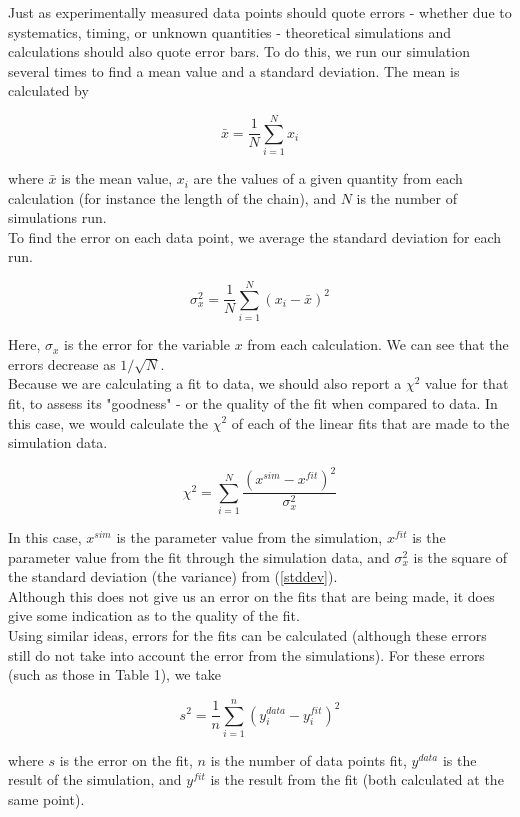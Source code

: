 \documentclass{article}
\begin{document}
\begin{multicols}{2}
Just as experimentally measured data points should quote errors - whether due to systematics, timing, or unknown quantities - theoretical simulations and calculations should also quote error bars.  To do this, we run our simulation several times to find a mean value and a standard deviation.  The mean is calculated by

\begin{equation}
\bar x = \frac{1}{N} \sum \limits _{i=1}^N x_i
\end{equation}

\noindent where $\bar x$ is the mean value, $x_i$ are the values of a given quantity from each calculation (for instance the length of the chain), and $N$ is the number of simulations run.\\

To find the error on each data point, we average the standard deviation for each run.

\begin{equation}
\label{stddev}
\sigma _x^2 = \frac{1}{N} \sum \limits _{i=1} ^N (x_i - \bar x)^2
\end{equation}

\noindent Here, $\sigma _x$ is the error for the variable $x$ from each calculation.  We can see that the errors decrease as $1/\sqrt{N}$.  \\

Because we are calculating a fit to data, we should also report a $\chi ^2$ value for that fit, to assess its "goodness" - or the quality of the fit when compared to data.  \cite{Nunes}  In this case, we would calculate the $\chi^2$ of each of the linear fits that are made to the simulation data.

\begin{equation}
\chi ^2 = \sum \limits _{i=1} ^N \frac{(x^{sim} - x^{fit})^2}{\sigma _x ^2}
\end{equation}

\noindent In this case, $x^{sim}$ is the parameter value from the simulation, $x^{fit}$ is the parameter value from the fit through the simulation data, and $\sigma _x ^2$ is the square of the standard deviation (the variance) from (\ref{stddev}). \\

Although this does not give us an error on the fits that are being made, it does give some indication as to the quality of the fit.\\

Using similar ideas, errors for the fits can be calculated (although these errors still do not take into account the error from the simulations).  For these errors (such as those in Table 1), we take

\begin{equation}
s^2 = \frac{1}{n} \sum \limits _{i=1} ^{n} (y^{data}_i - y^{fit}_i)^2
\end{equation}

\noindent where $s$ is the error on the fit, $n$ is the number of data points fit, $y^{data}$ is the result of the simulation, and $y^{fit}$ is the result from the fit (both calculated at the same point).  \cite{staterr}

\end{multicols}


\end{document}
